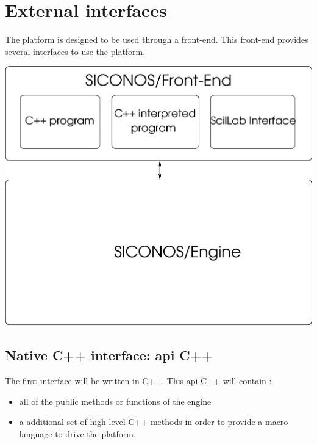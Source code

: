 
\section{External interfaces}
The platform is  designed to be used through a front-end. This front-end provides several interfaces to use the platform.\\

\begin{center}
\includegraphics[scale=0.7]{figure/interfaces_scheme.eps}
\end{center}

\subsection{Native C++ interface: \acs{api} C++ }
The first interface will be written in C++. This \acs{api} C++ will contain :
\begin{itemize}
\item all of the public methods or functions of the \acs{engine}
\item a additional set of high level C++ methods in order to provide a macro language to drive the platform. 
\end{itemize}

